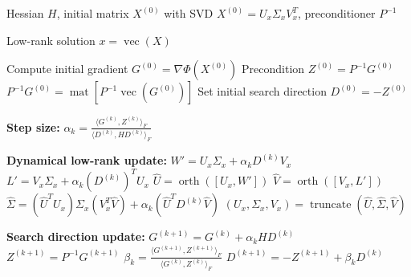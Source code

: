 \begin{algorithm}
\caption{Dynamical Low-Rank PCG Scheme}
\label{alg:dlr-pcg}
\begin{algorithmic}[1]

\Require Hessian $H$, initial matrix $X^{(0)}$ with SVD $X^{(0)} = U_x \Sigma_x V_x^T$, preconditioner $P^{-1}$

\Ensure Low-rank solution $x = \operatorname{vec}(X)$

\State Compute initial gradient $G^{(0)} = \nabla \Phi(X^{(0)})$
\State Precondition $Z^{(0)} = P^{-1} G^{(0)}$
\Comment $P^{-1} G^{(0)} =
\operatorname{mat}[P^{-1} \operatorname{vec}(G^{(0)})]$
\State Set initial search direction $D^{(0)} = -Z^{(0)}$


    \State \textbf{Step size:}
    \State $\displaystyle \alpha_k =
    \frac{\langle G^{(k)}, Z^{(k)} \rangle_F}
         {\langle D^{(k)}, H D^{(k)} \rangle_F}$

    \State \textbf{Dynamical low-rank update:}
    \State $W' = U_x \Sigma_x + \alpha_k D^{(k)} V_x$
    \State $L' = V_x \Sigma_x + \alpha_k (D^{(k)})^T U_x$
    \State $\hat U = \operatorname{orth}([U_x, W'])$
    \State $\hat V = \operatorname{orth}([V_x, L'])$
    \State $\hat \Sigma = (\hat U^T U_x)\Sigma_x(V_x^T \hat V) + \alpha_k (\hat U^T D^{(k)} \hat V)$
    \State $(U_x, \Sigma_x, V_x) = \operatorname{truncate}(\hat U, \hat \Sigma, \hat V)$

    \State \textbf{Search direction update:}
    \State $G^{(k+1)} = G^{(k)} + \alpha_k H D^{(k)}$
    \State $Z^{(k+1)} = P^{-1} G^{(k+1)}$
    \State $\displaystyle \beta_k =
    \frac{\langle G^{(k+1)}, Z^{(k+1)} \rangle_F}
         {\langle G^{(k)}, Z^{(k)} \rangle_F}$
    \State $D^{(k+1)} = -Z^{(k+1)} + \beta_k D^{(k)}$

\EndFor

\end{algorithmic}
\end{algorithm}
